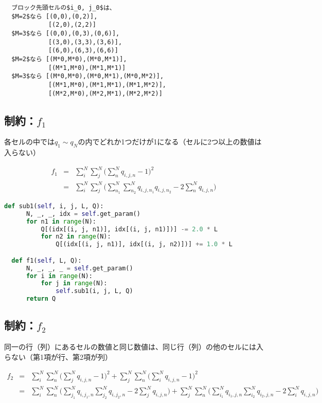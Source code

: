\documentclass[uplatex,dvipdfmx,a4paper,11pt,oneside,openany]{jsbook}
\begin{document}
\begin{verbatim}
  ブロック先頭セルの$i_0, j_0$は、
  $M=2$なら [(0,0),(0,2)],
            [(2,0),(2,2)]
  $M=3$なら [(0,0),(0,3),(0,6)],
            [(3,0),(3,3),(3,6)],
            [(6,0),(6,3),(6,6)]
  $M=2$なら [(M*0,M*0),(M*0,M*1)],
            [(M*1,M*0),(M*1,M*1)]
  $M=3$なら [(M*0,M*0),(M*0,M*1),(M*0,M*2)],
            [(M*1,M*0),(M*1,M*1),(M*1,M*2)],
            [(M*2,M*0),(M*2,M*1),(M*2,M*2)]
\end{verbatim}

\subsection{制約：$f_1$}

各セルの中では$q_1\sim q_N$の内でどれか1つだけが1になる（セルに2つ以上の数値は入らない）

\begin{eqnarray*}
  f_1 &=& \sum_i^N\sum_j^N\bigg(\sum_n^N q_{i,j,n} - 1\bigg)^2\\
  &=& \sum_i^N\sum_j^N\bigg(\sum_{n_1}^N\sum_{n_2}^N q_{i,j,n_1}q_{i,j,n_2} -2\sum_n^N q_{i,j,n} \bigg)
\end{eqnarray*}

\begin{lstlisting}[language=Python]
  def sub1(self, i, j, L, Q):
      N, _, _, idx = self.get_param()
      for n1 in range(N):
          Q[(idx[(i, j, n1)], idx[(i, j, n1)])] -= 2.0 * L
          for n2 in range(N):
              Q[(idx[(i, j, n1)], idx[(i, j, n2)])] += 1.0 * L

  def f1(self, L, Q):
      N, _, _, _ = self.get_param()
      for i in range(N):
          for j in range(N):
              self.sub1(i, j, L, Q)
      return Q
\end{lstlisting}

\subsection{制約：$f_2$}

同一の行（列）にあるセルの数値と同じ数値は、同じ行（列）の他のセルには入らない（第1項が行、第2項が列）

\begin{eqnarray*}
  f_2 &=& \sum_i^N\sum_n^N\bigg(\sum_j^N q_{i,j,n} - 1\bigg)^2 + \sum_j^N\sum_n^N\bigg(\sum_i^N q_{i,j,n} - 1\bigg)^2\\
  &=& \sum_i^N\sum_n^N\bigg(\sum_{j_1}^Nq_{i,j_1,n}\sum_{j_2}^Nq_{i,j_2,n} - 2\sum_j^N q_{i,j,n}\bigg)
  + \sum_j^N\sum_n^N\bigg(\sum_{i_1}^Nq_{i_1,j,n}\sum_{i_2}^Nq_{i_2,j,n} - 2\sum_i^N q_{i,j,n}\bigg)
\end{eqnarray*}
\end{document}
